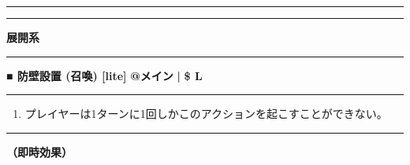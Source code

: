 \documentclass[twocolumn,a5paper,papersize,10pt]{jarticle}
\begin{document}
\begin{center}
\begin{center}
\hrule height 1mm depth 0mm width 66.5mm %
\vspace{1mm}%
{\Large\bf {}}
\vspace{1mm}%
\hrule height 0.5mm depth 0mm width 66.5mm %
\end{center}
\end{center}
\vspace{-1zh}%


\begin{tcolorbox}
{\scriptsize\bf 展開系}
\end{tcolorbox}
\vspace{-1zh}%
\vspace{2mm} %
\hrule height 0.5mm depth 0mm width 66.5mm %
\vspace{1mm} %
{\small\bf ■ 防壁設置 {\scriptsize (召喚) [lite]}} %
\hfill 
{\footnotesize\bf @メイン }
  {\footnotesize\bf | } {\footnotesize\bf \$ L}


\vspace{1mm}%
\hrule height 0.1mm depth 0mm width 66.5mm %
\vspace{1mm}%


\vspace{-1zh}%
\begin{enumerate}
\renewcommand{\labelenumi}{※}
\setlength{\leftskip}{-0.3cm}
\setlength{\itemsep}{0pt} %
\setlength{\parskip}{0pt} %

\item プレイヤーは1ターンに1回しかこのアクションを起こすことができない。

\vspace{-3mm}%
\end{enumerate}
\vspace{1mm}%
\hrule height 0.1mm depth 0mm width 66.5mm %
\vspace{1mm}%

{\bf（即時効果）}
\end{document}
